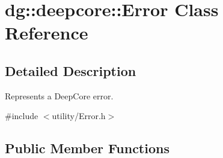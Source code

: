 \hypertarget{classdg_1_1deepcore_1_1_error}{}\section{dg\+:\+:deepcore\+:\+:Error Class Reference}
\label{classdg_1_1deepcore_1_1_error}


\subsection{Detailed Description}
Represents a Deep\+Core error. 

{\ttfamily \#include $<$utility/\+Error.\+h$>$}

\subsection*{Public Member Functions}
